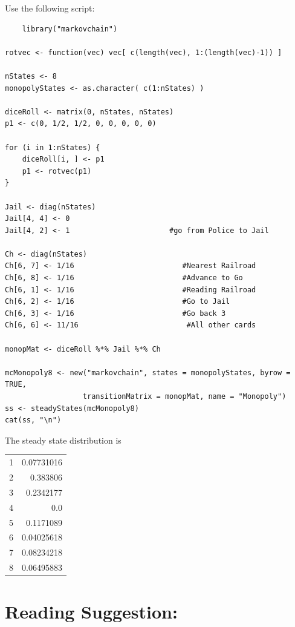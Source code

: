 \documentclass[12pt]{article}
\begin{document}
\begin{solution}
  Use the following script:
  \begin{lstlisting}
    library("markovchain")

rotvec <- function(vec) vec[ c(length(vec), 1:(length(vec)-1)) ]

nStates <- 8
monopolyStates <- as.character( c(1:nStates) )

diceRoll <- matrix(0, nStates, nStates)
p1 <- c(0, 1/2, 1/2, 0, 0, 0, 0, 0)

for (i in 1:nStates) {
    diceRoll[i, ] <- p1
    p1 <- rotvec(p1)
}

Jail <- diag(nStates)
Jail[4, 4] <- 0
Jail[4, 2] <- 1                       #go from Police to Jail

Ch <- diag(nStates)
Ch[6, 7] <- 1/16                         #Nearest Railroad
Ch[6, 8] <- 1/16                         #Advance to Go
Ch[6, 1] <- 1/16                         #Reading Railroad
Ch[6, 2] <- 1/16                         #Go to Jail
Ch[6, 3] <- 1/16                         #Go back 3
Ch[6, 6] <- 11/16                         #All other cards

monopMat <- diceRoll %*% Jail %*% Ch

mcMonopoly8 <- new("markovchain", states = monopolyStates, byrow = TRUE,
                  transitionMatrix = monopMat, name = "Monopoly")
ss <- steadyStates(mcMonopoly8)
cat(ss, "\n")
\end{lstlisting}

  The steady state distribution is
  \begin{tabular}{rr}
    1 & 0.07731016 \\
    2 & 0.383806   \\
    3 & 0.2342177  \\
    4 & 0.0        \\
    5 & 0.1171089  \\
    6 & 0.04025618 \\
    7 & 0.08234218 \\
    8 & 0.06495883 \\
  \end{tabular}
\end{solution}

\hr

\section*{Reading Suggestion:}
\end{document}
